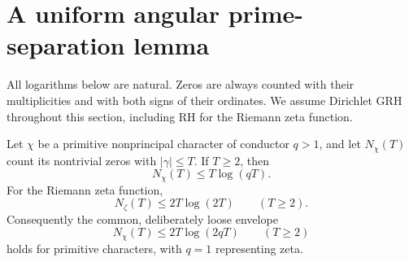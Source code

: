 
\section{A uniform angular prime-separation lemma}

All logarithms below are natural.  Zeros are always counted with their
multiplicities and with both signs of their ordinates.  We assume Dirichlet
GRH throughout this section, including RH for the Riemann zeta function.

\begin{lemma}
Let $\chi$ be a primitive nonprincipal character of conductor $q>1$, and let
$N_\chi(T)$ count its nontrivial zeros with $|\gamma|\le T$.  If $T\ge2$, then
\[
 N_\chi(T)\le T\log(qT).
\]
For the Riemann zeta function,
\[
 N_\zeta(T)\le2T\log(2T)\qquad(T\ge2).
\]
Consequently the common, deliberately loose envelope
\begin{equation}\label{eq:angular-count}
 N_\chi(T)\le2T\log(2qT)\qquad(T\ge2)
\end{equation}
holds for primitive characters, with $q=1$ representing zeta.
\end{lemma}

